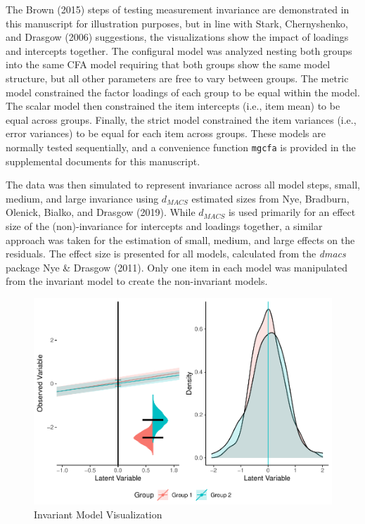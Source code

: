 \documentclass[
  man]{apa6}
\begin{document}
The Brown (2015) steps of testing measurement invariance are demonstrated in this manuscript for illustration purposes, but in line with Stark, Chernyshenko, and Drasgow (2006) suggestions, the visualizations show the impact of loadings and intercepts together. The configural model was analyzed nesting both groups into the same CFA model requiring that both groups show the same model structure, but all other parameters are free to vary between groups. The metric model constrained the factor loadings of each group to be equal within the model. The scalar model then constrained the item intercepts (i.e., item mean) to be equal across groups. Finally, the strict model constrained the item variances (i.e., error variances) to be equal for each item across groups. These models are normally tested sequentially, and a convenience function \texttt{mgcfa} is provided in the supplemental documents for this manuscript.

The data was then simulated to represent invariance across all model steps, small, medium, and large invariance using \(d_{MACS}\) estimated sizes from Nye, Bradburn, Olenick, Bialko, and Drasgow (2019). While \(d_{MACS}\) is used primarily for an effect size of the (non)-invariance for intercepts and loadings together, a similar approach was taken for the estimation of small, medium, and large effects on the residuals. The effect size is presented for all models, calculated from the \emph{dmacs} package Nye \& Drasgow (2011). Only one item in each model was manipulated from the invariant model to create the non-invariant models.

\begin{figure}
\centering
\includegraphics{manuscript_files/figure-latex/invariant-pic-1.pdf}
\caption{\label{fig:invariant-pic}Invariant Model Visualization}
\end{figure}
\end{document}
